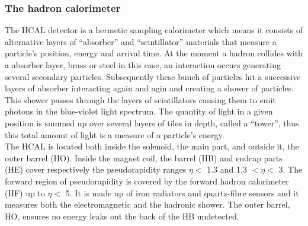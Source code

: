 \subsubsection{The hadron calorimeter}
The HCAL detector is a hermetic sampling calorimeter which means it
consists of alternative layers of ``absorber'' and ``scintillator''
materials that measure a particle’s position, energy and arrival time.
At the moment a hadron collides with a absorber layer, brass or steel
in this case, an interaction occurs generating several secondary
particles. Subsequently these bunch of particles hit a successive layers
of absorber interacting again and agin and creating a shower of particles.
This shower passes through the layers of scintillators
causing them to emit photons in the blue-violet light spectrum.
The quantity of light in a given position is summed up over several
layers of tiles in depth, called a “tower”, thus this total amount of
light is a measure of a particle’s energy.\\
The HCAL is located both inside the solenoid, the main part, and
outside it, the outer barrel (HO). 
Inside the magnet coil, the barrel (HB) and endcap parts (HE) cover
respectively the pseudorapidity
ranges $\eta<$ 1.3 and 1.3 $<\eta<$ 3.
The forward region of pseudorapidity is covered by the forward hadron
calorimeter (HF) up to $\eta<$ 5. It is made up of iron radiators and
quartz-fibre sensors and it measures both the electromagnetic and the hadronic shower. 
The outer barrel, HO, ensures no energy leaks out the
back of the HB undetected.

